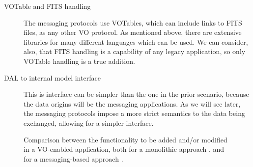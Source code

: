 \begin{description}
\begin{description}
				\item[VOTable and FITS handling] The messaging
				protocols use VOTables, which can include links to
				FITS files, as any other VO protocol. As mentioned
				above, there are extensive libraries for many
				different languages which can be used. We can
				consider, also, that FITS handling is a capability
				of any legacy application, so only VOTable handling
				is a true addition.
				
				\item[DAL to internal model interface] This is
				interface can be simpler than the one in the prior
				scenario, because the data origins will be the
				messaging applications. As we will see later, the
				messaging protocols impose a more strict semantics
				to the data being exchanged, allowing for a simpler
				interface.
			\end{description} 
		\end{description}
		
		
		\begin{figure}[tbp]
			\centering
			\vfill
			\caption[Modules for monolithic message-based VO-enabled
			applications]
			{
				Comparison between the functionality to be added
				and/or modified in a VO-enabled application, both
				for a monolithic approach
				, and for a
				messaging-based approach
				.
			}
			\label{fig:monolithic_vs_modular_VO_capabilities}
		\end{figure}
		

